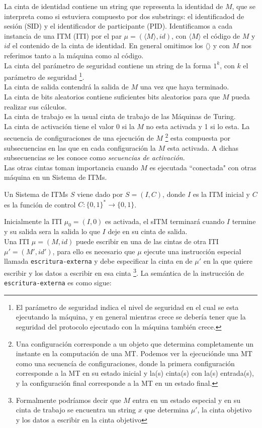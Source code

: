 La cinta de identidad contiene un string que representa la identidad de $M$, que se interpreta
como si estuviera compuesto por dos substrings: el identificadod de sesión (SID) y el identificador
de participante (PID). Identificamos a cada instancia de una ITM (ITI) por el par
$\mu = (\langle M \rangle, id)$, con $\langle M \rangle$ el código de $M$ y $id$ el contenido de la cinta
de identidad. En general omitimos los $\langle \rangle$ y con $M$ nos referimos tanto a la máquina como
al código.\\
La cinta del parámetro de seguridad contiene un string de la forma $1^k$, con $k$ el parámetro de seguridad 
\footnote{El parámetro de seguridad indica el nivel de seguridad en el cual se esta ejecutando
la máquina, y en general mientras crece se debería tener que la seguridad del protocolo ejecutado
con la máquina también crece.}.\\
La cinta de salida contendrá la salida de $M$ una vez que haya terminado.\\
La cinta de bits aleatorios contiene suficientes bits aleatorios para que $M$ pueda realizar sus cálculos.\\
La cinta de trabajo es la usual cinta de trabajo de las Máquinas de Turing.\\
La cinta de activación tiene el valor 0 si la $M$ no esta activada y 1 si lo esta. La secuencia de
configuraciones de una ejecución de $M$
\footnote{Una configuración corresponde a un objeto que determina completamente un instante
en la computación de una MT. Podemos ver la ejecuciónde una MT como una secuencía de configuraciones, donde la
primera configuración corresponde a la MT en su estado inicial y la(s) cinta(s) con la(s) entrada(s), y la
configuración final corresponde a la MT en un estado final.}
esta compuesta por subsecuencias en las
que en cada configuración la $M$ esta activada. A dichas subsecuencias se les conoce como \textit{secuencias
de activación}.\\
Las otras cintas toman importancia cuando $M$ es ejecutada ``conectada" con otras máquina
en un Sistema de ITMs.\\

\begin{definicion}
Un Sistema de ITMs $S$ viene dado por $S = (I, C)$, donde $I$ es la ITM inicial y $C$ es la función
de control $C:\{0,1\}^* \to \{0,1\}$.
\end{definicion}
Inicialmente la ITI $\mu_0 = (I, 0)$ es activada, el sITM terminará cuando $I$ termine y su
salida sera la salida lo que $I$ deje en su cinta de salida.\\
Una ITI $\mu = (M, id)$ puede escribir en una de las cintas de otra ITI $\mu' = (M', id')$, 
para ello es necesario que $\mu$ ejecute una instrucción
especial llamada \texttt{escritura-externa} y debe especificar la cinta en de $\mu'$ en la que quiere
escribir y los datos a escribir en esa cinta
\footnote{Formalmente podríamos decir que $M$ entra en un estado especial y en su cinta de
trabajo se encuentra un string $x$ que determina $\mu'$, la cinta objetivo y los datos a escribir
en la cinta objetivo}.
La semántica de la instrucción de \texttt{escritura-externa} es como sigue:\\

